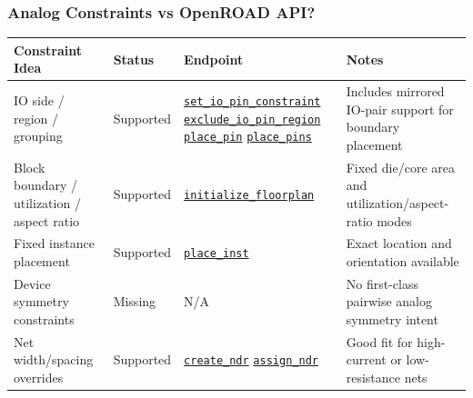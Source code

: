 \documentclass[aspectratio=169]{beamer}
\begin{document}
\begin{frame}
  \frametitle{Analog Constraints vs OpenROAD API?}
  \tiny
  \begin{center}
    \begin{tabular}{p{2.6cm}|p{1.2cm}|p{3.9cm}|p{4.0cm}}
      \hline
      \textbf{Constraint Idea} & \textbf{Status} & \textbf{Endpoint} & \textbf{Notes} \\
      \hline
      IO side / region / grouping &
      Supported &
      \href{https://openroad.readthedocs.io/en/latest/main/src/ppl/README.html\#set-io-pin-constraints}{\texttt{set\_io\_pin\_constraint}} \newline
      \href{https://openroad.readthedocs.io/en/latest/main/src/ppl/README.html\#exclude-io-pin-region}{\texttt{exclude\_io\_pin\_region}} \newline
      \href{https://openroad.readthedocs.io/en/latest/main/src/ppl/README.html\#place-specific-pin}{\texttt{place\_pin}} \newline
      \href{https://openroad.readthedocs.io/en/latest/main/src/ppl/README.html\#place-all-pins}{\texttt{place\_pins}} &
      Includes mirrored IO-pair support for boundary placement \\
      \hline
      Block boundary / utilization / aspect ratio &
      Supported &
      \href{https://openroad.readthedocs.io/en/latest/main/src/ifp/README.html\#initialize-floorplan}{\texttt{initialize\_floorplan}} &
      Fixed die/core area and utilization/aspect-ratio modes \\
      \hline
      Fixed instance placement &
      Supported &
      \href{https://openroad.readthedocs.io/en/latest/main/src/README.html\#tcl-functions}{\texttt{place\_inst}} &
      Exact location and orientation available \\
      \hline
      Device symmetry constraints &
      Missing &
      N/A &
      No first-class pairwise analog symmetry intent \\
      \hline
      Net width/spacing overrides &
      Supported &
      \href{https://openroad.readthedocs.io/en/latest/main/src/odb/README.html\#create-ndr}{\texttt{create\_ndr}} \newline
      \href{https://openroad.readthedocs.io/en/latest/main/src/README.html\#tcl-functions}{\texttt{assign\_ndr}} &
      Good fit for high-current or low-resistance nets \\

\end{tabular}
\end{center}
\end{frame}
\end{document}
